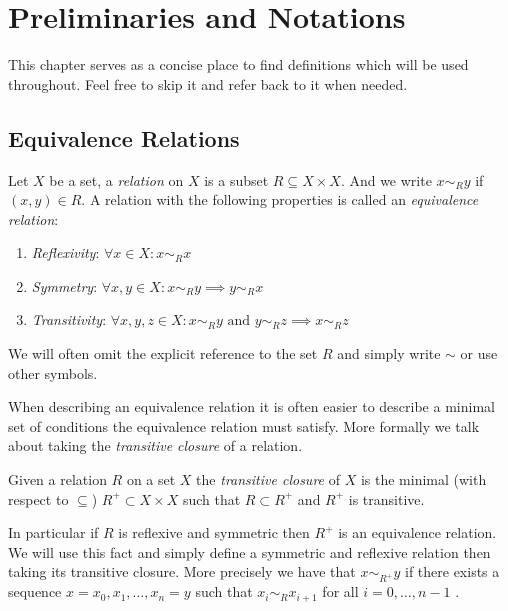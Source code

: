 \chapter{Preliminaries and Notations}
\label{chapter__preliminaries}

This chapter serves as a concise place to find definitions which will be used throughout. Feel free to skip it and refer back to it when needed.

\section{Equivalence Relations}

\begin{definition}{}{}
    Let $X$ be a set, a \emph{relation} on $X$ is a subset $R \subseteq X \times X$. And we write $x \sim_R y$ if $(x,y) \in R$.
    A relation with the following properties is called an \emph{equivalence relation}:
    \begin{enumerate}
        \item \emph{Reflexivity}: $\forall x \in X: x \sim_R x$
        \item \emph{Symmetry}: $\forall x,y \in X: x \sim_R y \implies y \sim_R x$
        \item \emph{Transitivity}: $\forall x,y,z \in X: x \sim_R y \text{ and } y \sim_R z \implies x \sim_R z$
    \end{enumerate}
    We will often omit the explicit reference to the set $R$ and simply write $\sim$ or use other symbols.
\end{definition}

When describing an equivalence relation it is often easier to describe a minimal set of conditions the equivalence relation must satisfy. More formally we talk about taking the \emph{transitive closure} of a relation.

\begin{definition}{}{}
    Given a relation $R$ on a set $X$ the \emph{transitive closure} of $X$ is the minimal (with respect to $\subseteq$) $R^+ \subset X \times X$ such that $R \subset R^+$ and $R^+$ is transitive.
\end{definition}

In particular if $R$ is reflexive and symmetric then $R^+$ is an equivalence relation.
We will use this fact and simply define a symmetric and reflexive relation then taking its transitive closure. More precisely we have that $x \sim_{R^+} y$ if there exists a sequence $x = x_0, x_1, \dots, x_n = y$ such that $x_i \sim_R x_{i+1}$ for all $i = 0, \dots, n-1$ \cite[p.~337]{Lidl1997-kc}.

